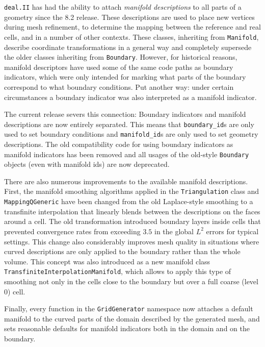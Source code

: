 \documentclass{ansarticle-preprint}
\newcommand{\specialword}[1]{\texttt{#1}}
\newcommand{\dealii}{{\specialword{deal.II}}\xspace}
\begin{document}
\dealii{} has had the ability to attach \textit{manifold descriptions} to all
parts of a geometry since the 8.2 release. These descriptions are used to place
new vertices during mesh refinement, to determine the mapping between the
reference and real cells, and in a number of other contexts. These classes,
inheriting from \texttt{Manifold}, describe coordinate transformations in a
general way and completely supersede the older classes inheriting from
\texttt{Boundary}. However, for historical reasons, manifold descriptors have
used some of the same code paths as boundary indicators, which were only
intended for marking what parts of the boundary correspond to what boundary
conditions. Put another way: under certain circumstances a boundary indicator
was also interpreted as a manifold indicator.

The current release severs this connection: Boundary indicators and manifold
descriptions are now entirely separated. This means that \texttt{boundary\_id}s
are only used to set boundary conditions and \texttt{manifold\_id}s are only
used to set geometry descriptions. The old compatibility code for using boundary
indicators as manifold indicators has been removed and all usages of the
old-style \texttt{Boundary} objects (even with manifold ids) are now deprecated.

There are also numerous improvements to the available manifold descriptions.
First, the manifold smoothing algorithms applied in the \texttt{Triangulation}
class and \texttt{MappingQGeneric} have been changed from the old Laplace-style
smoothing to a transfinite interpolation that linearly blends between the
descriptions on the faces around a cell. The old transformation introduced
boundary layers inside cells that prevented convergence rates from exceeding
\(3.5\) in the global \(L^2\) errors for typical settings. This change also
considerably improves mesh quality in situations where curved descriptions are
only applied to the boundary rather than the whole volume. This concept was also
introduced as a new manifold class \texttt{TransfiniteInterpolationManifold},
which allows to apply this type of smoothing not only in the cells close to the
boundary but over a full coarse (level 0) cell.

Finally, every function in the \texttt{GridGenerator} namespace now attaches a
default manifold to the curved parts of the domain described by the generated
mesh, and sets reasonable defaults for manifold indicators both in the domain
and on the boundary.

\end{document}
